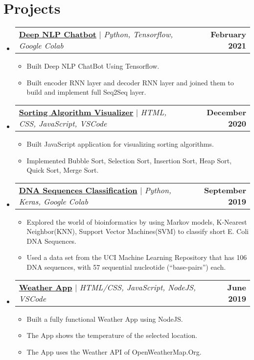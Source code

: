 \documentclass[letterpaper,11pt]{article}
\makeatletter
\newcommand{\resumeItem}[1]{
  \item\small{
    {#1 \vspace{-2pt}}
  }
}
\newcommand{\resumeProjectHeading}[2]{
    \item
    \begin{tabular*}{1.001\textwidth}{l@{\extracolsep{\fill}}r}
      \small#1 & \textbf{\small #2}\\
    \end{tabular*}\vspace{-7pt}
}
\newcommand{\resumeSubHeadingListStart}{\begin{itemize}[leftmargin=0.0in, label={}]}
\newcommand{\resumeSubHeadingListEnd}{\end{itemize}}
\newcommand{\resumeItemListStart}{\begin{itemize}}
\newcommand{\resumeItemListEnd}{\end{itemize}\vspace{-5pt}}
\makeatother
\begin{document}
\section{Projects}
    \vspace{-5pt}
    \resumeSubHeadingListStart
      \resumeProjectHeading
          {\textbf{\href{https://github.com/vishalroy2198/Deep-Learning-NLP-ChatBot}{Deep NLP Chatbot}} $|$ \emph{Python, Tensorflow, Google Colab}}{February 2021}
          \resumeItemListStart
            \resumeItem{Built Deep NLP ChatBot Using Tensorflow.}
            \resumeItem{Built encoder RNN layer and decoder RNN layer and joined them to build and implement full Seq2Seq layer.}
          \resumeItemListEnd
          \vspace{-17pt}
      \resumeProjectHeading
          {\textbf{\href{https://github.com/vishalroy2198/Popular-Sorting-Algorithms-Visualizer}{Sorting Algorithm Visualizer}} $|$ \emph{HTML, CSS, JavaScript, VSCode}}{December 2020}
          \resumeItemListStart
            \resumeItem{Built JavaScript application for visualizing sorting algorithms.}
            \resumeItem{Implemented Bubble Sort, Selection Sort, Insertion Sort, Heap Sort, Quick Sort, Merge Sort.}
          \resumeItemListEnd 
          \vspace{-17pt}
          \resumeProjectHeading
          {\textbf{\href{https://github.com/vishalroy2198/DNA-Sequences-Classification}{DNA Sequences Classification}} $|$ \emph{Python, Keras, Google Colab}}{September 2019}
          \resumeItemListStart
            \resumeItem{Explored the world of bioinformatics by using Markov models, K-Nearest Neighbor(KNN), Support Vector Machines(SVM) to classify short E. Coli DNA Sequences.}
            \resumeItem{Used a data set from the UCI Machine Learning Repository that has 106 DNA sequences, with 57 sequential nucleotide (“base-pairs”) each.}
          \resumeItemListEnd
          \vspace{-17pt}
           \resumeProjectHeading
          {\textbf{\href{https://github.com/vishalroy2198/NodeJs-Weather-Website}{Weather App}} $|$ \emph{HTML/CSS, JavaScript, NodeJS, VSCode}}{June 2019}
          \resumeItemListStart
            \resumeItem{Built a fully functional Weather App using NodeJS.}
            \resumeItem{The App shows the temperature of the selected location.}
            \resumeItem{The App uses the Weather API of OpenWeatherMap.Org.}
          \resumeItemListEnd 
    \resumeSubHeadingListEnd
\vspace{-16pt}
\end{document}

